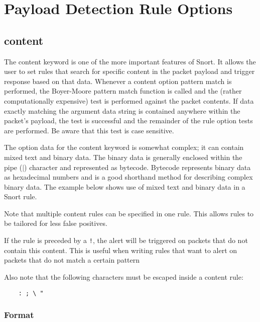 \documentclass[english]{report}
\newenvironment{note}{
\samepage
    \vspace{10pt}{\textsf{
        {\hspace{7pt}\Huge{$\triangle$\hspace{-12.5pt}{\Large{$^!$}}}}\hspace{5pt}
        {\Large{NOTE}}
    }
    }
   \begin{center}
    \par\vspace{-17pt}

    \begin{lrbox}{\savepar}
    \begin{minipage}[r]{6in}
}
{
    \end{minipage}
    \end{lrbox}
    \fbox{
        \usebox{
            \savepar
	}
    }
    \par\vskip10pt
    \end{center}
}
\newenvironment{note}{
        \begin{rawhtml}
        <p><table border="1"><tr><td><b>
        Note:&nbsp;&nbsp;</b>
        \end{rawhtml}
}{
        \begin{rawhtml}
        </b></td></tr></table></p>
        \end{rawhtml}
}
\begin{document}
\section{Payload Detection Rule Options}
\subsection{content}
\label{sub:content}

The content keyword is one of the more important features of Snort.  It allows
the user to set rules that search for specific content in the packet payload
and trigger response based on that data. Whenever a content option pattern
match is performed, the Boyer-Moore pattern match function is called and the
(rather computationally expensive) test is performed against the packet
contents. If data exactly matching the argument data string is contained
anywhere within the packet's payload, the test is successful and the remainder
of the rule option tests are performed. Be aware that this test is case
sensitive.

The option data for the content keyword is somewhat complex; it can contain
mixed text and binary data. The binary data is generally enclosed within the
pipe ($|$) character and represented as bytecode. Bytecode represents binary
data as hexadecimal numbers and is a good shorthand method for describing
complex binary data.  The example below shows use of mixed text and binary data
in a Snort rule. 

Note that multiple content rules can be specified in one rule. This allows
rules to be tailored for less false positives. 

If the rule is preceded by a \texttt{!}, the alert will be triggered on packets
that do not contain this content. This is useful when writing rules that want
to alert on packets that do not match a certain pattern

\begin{note}

Also note that the following characters must be escaped inside a content rule:

\begin{verbatim}
    : ; \ "
\end{verbatim}
\end{note}

\subsubsection{Format}
\end{document}
